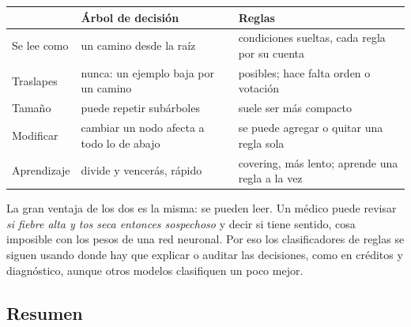 \documentclass[11pt,letterpaper]{article}
\begin{document}
\begin{center}
\small
\begin{tabular}{l>{\raggedright\arraybackslash}p{5.4cm}%
                 >{\raggedright\arraybackslash}p{5.4cm}}
    \toprule
    & \textbf{Árbol de decisión} & \textbf{Reglas} \\
    \midrule
    Se lee como & un camino desde la raíz & condiciones sueltas, cada
                                             regla por su cuenta \\
    \addlinespace
    Traslapes & nunca: un ejemplo baja por un camino
              & posibles; hace falta orden o votación \\
    \addlinespace
    Tamaño & puede repetir subárboles
           & suele ser más compacto \\
    \addlinespace
    Modificar & cambiar un nodo afecta a todo lo de abajo
              & se puede agregar o quitar una regla sola \\
    \addlinespace
    Aprendizaje & divide y vencerás, rápido
                & covering, más lento; aprende una regla a la vez \\
    \bottomrule
\end{tabular}
\end{center}

\begin{idea}
    La gran ventaja de los dos es la misma: se pueden leer. Un médico
    puede revisar \textit{si fiebre alta y tos seca entonces
    sospechoso} y decir si tiene sentido, cosa imposible con los pesos
    de una red neuronal. Por eso los clasificadores de reglas se siguen
    usando donde hay que explicar o auditar las decisiones, como en
    créditos y diagnóstico, aunque otros modelos clasifiquen un poco
    mejor.
\end{idea}


\subsection*{Resumen}
\end{document}
